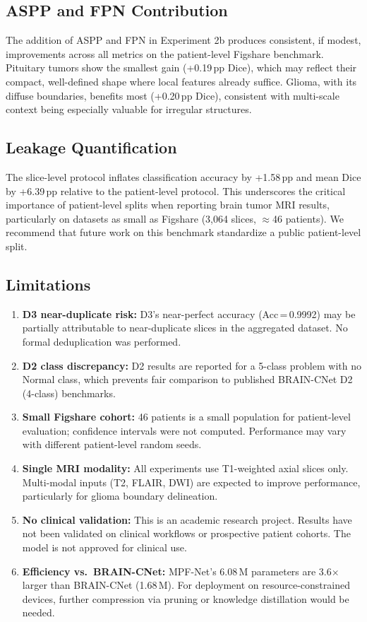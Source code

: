 \documentclass[journal]{IEEEtran}
\begin{document}
\subsection{ASPP and FPN Contribution}
The addition of ASPP and FPN in Experiment 2b produces consistent, if modest,
improvements across all metrics on the patient-level Figshare benchmark.
Pituitary tumors show the smallest gain (+0.19\,pp Dice), which may reflect
their compact, well-defined shape where local features already suffice.
Glioma, with its diffuse boundaries, benefits most (+0.20\,pp Dice), consistent
with multi-scale context being especially valuable for irregular structures.

\subsection{Leakage Quantification}
The slice-level protocol inflates classification accuracy by +1.58\,pp and
mean Dice by +6.39\,pp relative to the patient-level protocol. This underscores
the critical importance of patient-level splits when reporting brain tumor
MRI results, particularly on datasets as small as Figshare (3{,}064 slices,
$\approx$46 patients). We recommend that future work on this benchmark
standardize a public patient-level split.

\subsection{Limitations}
\begin{enumerate}
  \item \textbf{D3 near-duplicate risk:} D3's near-perfect accuracy
  (Acc\,=\,0.9992) may be partially attributable to near-duplicate slices
  in the aggregated dataset. No formal deduplication was performed.
  \item \textbf{D2 class discrepancy:} D2 results are reported for a 5-class
  problem with no Normal class, which prevents fair comparison to published
  BRAIN-CNet D2 (4-class) benchmarks.
  \item \textbf{Small Figshare cohort:} 46 patients is a small population for
  patient-level evaluation; confidence intervals were not computed. Performance
  may vary with different patient-level random seeds.
  \item \textbf{Single MRI modality:} All experiments use T1-weighted axial
  slices only. Multi-modal inputs (T2, FLAIR, DWI) are expected to improve
  performance, particularly for glioma boundary delineation.
  \item \textbf{No clinical validation:} This is an academic research project.
  Results have not been validated on clinical workflows or prospective patient
  cohorts. The model is not approved for clinical use.
  \item \textbf{Efficiency vs.\ BRAIN-CNet:} MPF-Net's 6.08\,M parameters
  are 3.6$\times$ larger than BRAIN-CNet (1.68\,M). For deployment on
  resource-constrained devices, further compression via pruning or
  knowledge distillation would be needed.
\end{enumerate}
\end{document}

